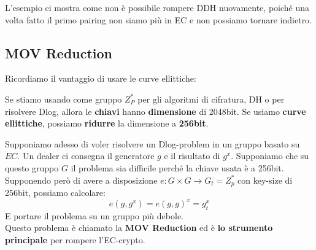 \begin{remark}
L'esempio ci mostra come non è possibile rompere DDH nuovamente, poiché una volta fatto il primo pairing non siamo più in EC e non possiamo tornare indietro.
\end{remark}
\subsection{MOV Reduction}
Ricordiamo il vantaggio di usare le curve ellittiche:
\begin{property}Se stiamo usando come gruppo $Z^*_P$ per gli algoritmi di cifratura, DH o per risolvere Dlog, allora le \textbf{chiavi} hanno \textbf{dimensione} di 2048bit. Se usiamo \textbf{curve ellittiche}, possiamo \textbf{ridurre} la dimensione a \textbf{256bit}.  
\end{property}
Supponiamo adesso di voler risolvere un Dlog-problem in un gruppo basato su $EC$. Un dealer ci consegna il generatore $g$ e il risultato di $g^x$. Supponiamo che su questo gruppo $G$ il problema sia difficile perché la chiave usata è a 256bit. \\
Supponendo però di avere a disposizione $e:G\times G\longrightarrow G_t=Z_p^*$ con key-size di 256bit, possiamo calcolare:
\[e(g,g^x)=e(g,g)^x=g^x_t\]
E portare il problema su un gruppo più debole.\\
Questo problema è chiamato la \textbf{MOV Reduction} ed è \textbf{lo strumento principale} per rompere l'EC-crypto. 
